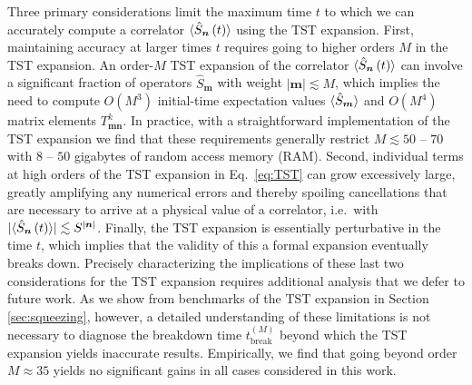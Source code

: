 \documentclass[aps,pra,twocolumn,longbibliography]{revtex4-2}
\renewcommand{\t}{\text} %
\newcommand{\p}[1]{\left( #1 \right)} %
\renewcommand{\v}{\bm} %
\renewcommand{\abs}[1]{\lvert #1 \rvert}
\newcommand{\bk}{\braket} %
\renewcommand{\O}{\mathcal{O}}
\newcommand{\1}{\mathds{1}}
\begin{document}
%
%
Three primary considerations limit the maximum time $t$ to which we
can accurately compute a correlator $\bk{\hat S_{\v n}\p{t}}$ using
the TST expansion.  First, maintaining accuracy at larger times $t$
requires going to higher orders $M$ in the TST expansion.  An
order-$M$ TST expansion of the correlator $\bk{\hat S_{\v n}\p{t}}$
can involve a significant fraction of operators $\hat S_{\v m}$ with
weight $\abs{\v m}\lesssim M$, which implies the need to compute
$O\p{M^3}$ initial-time expectation values $\bk{\hat S_{\v m}}$ and
$O\p{M^4}$ matrix elements $T^k_{\v m\v n}$.  In practice, with a
straightforward implementation of the TST expansion we find that these
requirements generally restrict $M\lesssim 50$ -- $70$ with $8$ --
$50$ gigabytes of random access memory (RAM).  Second, individual
terms at high orders of the TST expansion in Eq.~\eqref{eq:TST} can
grow excessively large, greatly amplifying any numerical errors and
thereby spoiling cancellations that are necessary to arrive at a
physical value of a correlator, i.e.~with
$\abs{\bk{\hat S_{\v n}\p{t}}}\lesssim S^{\abs{\v n}}$.  Finally, the
TST expansion is essentially perturbative in the time $t$, which
implies that the validity of this a formal expansion eventually breaks
down.  Precisely characterizing the implications of these last two
considerations for the TST expansion requires additional analysis that
we defer to future work.  As we show from benchmarks of the TST
expansion in Section \ref{sec:squeezing}, however, a detailed
understanding of these limitations is not necessary to diagnose the
breakdown time $t_{\t{break}}^{(M)}$ beyond which the TST expansion
yields inaccurate results.  Empirically, we find that going beyond
order $M\approx35$ yields no significant gains in all cases considered
in this work.
%
\end{document}
